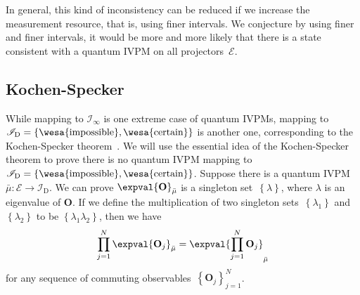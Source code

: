 \documentclass[english,reprint, aps, prl,superscriptaddress, showpacs,
showkeys, longbibliography, amsmath, amssymb]{revtex4-1}
\theoremstyle{plain}
\theoremstyle{definition}
\newcommand{\events}{\ensuremath{\mathcal{E}}}
\newcommand{\imposs}{{\text{\wesa{impossible}}}}
\newcommand{\necess}{{\text{\wesa{certain}}}}
\begin{document}
In general, this kind of inconsistency can be reduced if we increase
the measurement resource, that is, using finer intervals. We conjecture
by using finer and finer intervals, it would be more and more likely
that there is a state consistent with a quantum IVPM on all projectors~$\events$.

\subsection{Kochen-Specker}

While mapping to $\mathscr{I}_{\infty}$ is one extreme case of quantum
IVPMs, mapping to $\mathscr{I}_{\mathrm{D}}=\left\{ \imposs,\necess\right\} $
is another one, corresponding to the Kochen-Specker theorem~\cite{kochenspecker1967,peres1995quantum,Redhead1987-REDINA,Griffiths2003}.
We will use the essential idea of the Kochen-Specker theorem to prove
there is no quantum IVPM mapping to $\mathscr{I}_{\mathrm{D}}=\left\{ \imposs,\necess\right\} $.
Suppose there is a quantum IVPM~$\bar{\mu}:\events\rightarrow\mathscr{I}_{\mathrm{D}}$.
We can prove $\expval{\mathbf{O}}_{\bar{\mu}}$ is a singleton set~$\left\{ \lambda\right\} $,
where $\lambda$ is an eigenvalue of $\mathbf{O}$. If we define the
multiplication of two singleton sets~$\left\{ \lambda_{1}\right\} $
and $\left\{ \lambda_{2}\right\} $ to be $\left\{ \lambda_{1}\lambda_{2}\right\} $,
then we have 
\begin{equation}
\prod_{j=1}^{N}\expval{\mathbf{O}_{j}}_{\bar{\mu}}=\expval{\prod_{j=1}^{N}\mathbf{O}_{j}}_{\bar{\mu}}\label{eq:Kochen-Specker-Rules}
\end{equation}
for any sequence of commuting observables~$\left\{ \mathbf{O}_{j}\right\} _{j=1}^{N}$.
\end{document}
